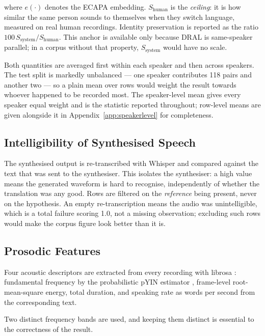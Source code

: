 where $e(\cdot)$ denotes the ECAPA embedding. $S_{\text{human}}$ is the \emph{ceiling}: it is how
similar the same person sounds to themselves when they switch language, measured on real human
recordings. Identity preservation is reported as the ratio
$100\,S_{\text{system}}/S_{\text{human}}$. This anchor is available only because DRAL is
same-speaker parallel; in a corpus without that property, $S_{\text{system}}$ would have no scale.

Both quantities are averaged first within each speaker and then across speakers. The test split is
markedly unbalanced --- one speaker contributes 118 pairs and another two --- so a plain mean over
rows would weight the result towards whoever happened to be recorded most. The speaker-level mean
gives every speaker equal weight and is the statistic reported throughout; row-level means are
given alongside it in Appendix~\ref{app:speakerlevel} for completeness.

\subsection{Intelligibility of Synthesised Speech}
The synthesised output is re-transcribed with Whisper and compared against the text that was sent
to the synthesiser. This isolates the synthesiser: a high value means the generated waveform is
hard to recognise, independently of whether the translation was any good. Rows are filtered on the
\emph{reference} being present, never on the hypothesis. An empty re-transcription means the audio
was unintelligible, which is a total failure scoring 1.0, not a missing observation; excluding such
rows would make the corpus figure look better than it is.

\subsection{Prosodic Features}
\label{sec:prosody_features}
Four acoustic descriptors are extracted from every recording with librosa
\cite{mcfee2015librosa}: fundamental frequency by the probabilistic pYIN estimator
\cite{mauch2014pyin}, frame-level root-mean-square energy, total duration, and speaking rate as
words per second from the corresponding text.

Two distinct frequency bands are used, and keeping them distinct is essential to the correctness of
the result.

